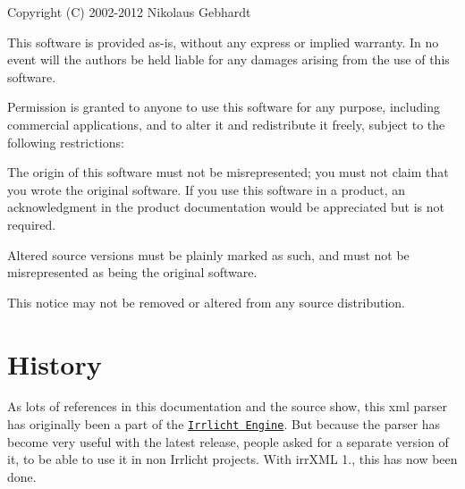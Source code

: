 Copyright (C) 2002-\/2012 Nikolaus Gebhardt

This software is provided \textquotesingle{}as-\/is\textquotesingle{}, without any express or implied warranty. In no event will the authors be held liable for any damages arising from the use of this software.

Permission is granted to anyone to use this software for any purpose, including commercial applications, and to alter it and redistribute it freely, subject to the following restrictions\+:


\begin{DoxyEnumerate}
\item The origin of this software must not be misrepresented; you must not claim that you wrote the original software. If you use this software in a product, an acknowledgment in the product documentation would be appreciated but is not required.
\item Altered source versions must be plainly marked as such, and must not be misrepresented as being the original software.
\item This notice may not be removed or altered from any source distribution.
\end{DoxyEnumerate}\hypertarget{index_history}{}\section{History}\label{index_history}
As lots of references in this documentation and the source show, this xml parser has originally been a part of the \href{http://irrlicht.sourceforge.net}{\tt Irrlicht Engine}. But because the parser has become very useful with the latest release, people asked for a separate version of it, to be able to use it in non Irrlicht projects. With irr\+X\+ML 1., this has now been done. 